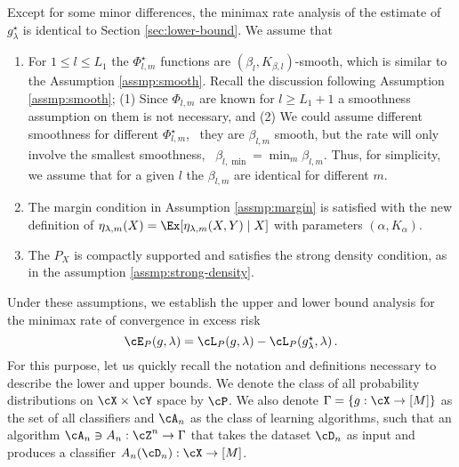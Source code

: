 Except for some minor differences, the minimax rate analysis of the estimate of $g_\lambda^\star$ is identical to Section \ref{sec:lower-bound}. We assume that
\begin{enumerate}
    \item For $1 \le l \le L_1$ the $\Phi_{l, m}^\star$ functions are $(\beta_l, K_{\beta, l})$-smooth, which is similar to the Assumption \ref{assmp:smooth}. Recall the discussion following Assumption \ref{assmp:smooth}; (1) Since $\Phi_{l, m}$ are known for $l \ge L_1 + 1$ a smoothness assumption on them is not necessary, and (2) We could assume different smoothness for different $\Phi_{l, m}^\star$, \ie\ they are $\beta_{l, m}$ smooth, but the rate will only involve the smallest smoothness, \ie\ $\beta_{l, \min} = \min_m \beta_{l, m}$. Thus, for simplicity, we assume that for a given $l$ the $\beta_{l, m}$ are identical for different $m$. 
    \item The margin condition in Assumption \ref{assmp:margin} is satisfied with the new definition of $\eta_{\lambda, m}(X) = \Ex[\eta_{\lambda, m}(X, Y)\mid X]$ with parameters $(\alpha, K_\alpha)$.
    \item  The $P_X$ is compactly supported and satisfies the strong density condition, as in the assumption \ref{assmp:strong-density}.
\end{enumerate}



Under these assumptions, we establish the upper and lower bound analysis for the minimax rate of convergence in excess risk
\[
\textstyle \cE_P(g, \lambda) = \cL_P(g, \lambda) - \cL_P(g_\lambda^\star, \lambda)\,.
\]
For this purpose, let us quickly recall the notation and definitions necessary to describe the lower and upper bounds. We denote the class of all probability distributions on $\cX \times \cY$ space by $\cP$.
We also denote $\Gamma = \{g: \cX \to [M]\}$ as the set of all classifiers and $\cA_n$ as the class of learning algorithms, such that an algorithm $\cA_n \ni A_n: \cZ^n \to \Gamma $ that takes the dataset $\cD_n $ as input and produces a classifier $A_n(\cD_n): \cX \to [M]$.

